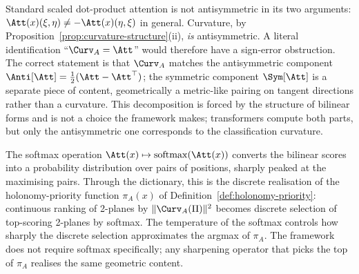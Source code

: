 \begin{remark}\label{rem:antisym-attention}
Standard scaled dot-product attention is not antisymmetric in its
two arguments: $\Att(x)(\xi,\eta)\neq -\Att(x)(\eta,\xi)$ in general.
Curvature, by Proposition~\ref{prop:curvature-structure}(ii), \emph{is}
antisymmetric. A literal identification ``$\Curv_A=\Att$'' would
therefore have a sign-error obstruction. The correct statement is
that $\Curv_A$ matches the antisymmetric component
$\Anti[\Att]=\tfrac12(\Att-\Att^\top)$; the symmetric component
$\Sym[\Att]$ is a separate piece of content, geometrically a
metric-like pairing on tangent directions rather than a curvature.
This decomposition is forced by the structure of bilinear forms and
is not a choice the framework makes; transformers compute both
parts, but only the antisymmetric one corresponds to the
classification curvature.
\end{remark}

\begin{remark}\label{rem:softmax-priority}
The softmax operation $\Att(x)\mapsto\mathrm{softmax}(\Att(x))$
converts the bilinear scores into a probability distribution over
pairs of positions, sharply peaked at the maximising pairs. Through
the dictionary, this is the discrete realisation of the
holonomy-priority function $\pi_A(x)$ of
Definition~\ref{def:holonomy-priority}: continuous ranking of
2-planes by $\|\Curv_A(\Pi)\|^2$ becomes discrete selection of
top-scoring 2-planes by softmax. The temperature of the softmax
controls how sharply the discrete selection approximates the
argmax of $\pi_A$. The framework does not require softmax
specifically; any sharpening operator that picks the top of
$\pi_A$ realises the same geometric content.
\end{remark}

